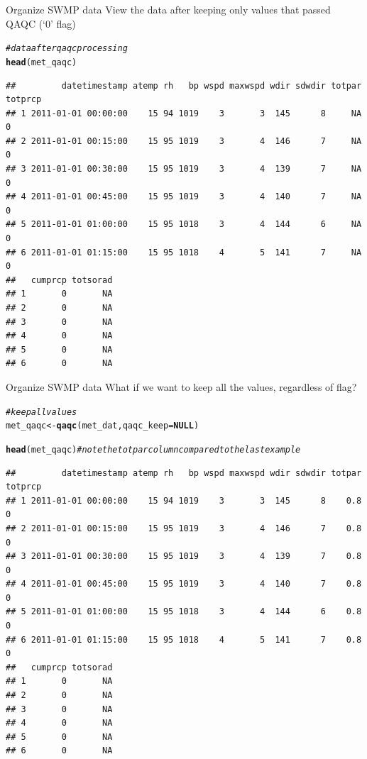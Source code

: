 \documentclass[xcolor=svgnames]{beamer}\usepackage[]{graphicx}\usepackage[]{color}
\makeatletter
\newcommand{\hlcom}[1]{\textcolor[rgb]{0.678,0.584,0.686}{\textit{#1}}}%
\newcommand{\hlstd}[1]{\textcolor[rgb]{0.345,0.345,0.345}{#1}}%
\newcommand{\hlkwa}[1]{\textcolor[rgb]{0.161,0.373,0.58}{\textbf{#1}}}%
\newcommand{\hlkwb}[1]{\textcolor[rgb]{0.69,0.353,0.396}{#1}}%
\newcommand{\hlkwc}[1]{\textcolor[rgb]{0.333,0.667,0.333}{#1}}%
\newcommand{\hlkwd}[1]{\textcolor[rgb]{0.737,0.353,0.396}{\textbf{#1}}}%
\newenvironment{kframe}{%
 \def\at@end@of@kframe{}%
 \ifinner\ifhmode%
  \def\at@end@of@kframe{\end{minipage}}%
  \begin{minipage}{\columnwidth}%
 \fi\fi%
 \def\FrameCommand##1{\hskip\@totalleftmargin \hskip-\fboxsep
 \colorbox{shadecolor}{##1}\hskip-\fboxsep
     \hskip-\linewidth \hskip-\@totalleftmargin \hskip\columnwidth}%
 \MakeFramed {\advance\hsize-\width
   \@totalleftmargin\z@ \linewidth\hsize
   \@setminipage}}%
 {\par\unskip\endMakeFramed%
 \at@end@of@kframe}
\newenvironment{knitrout}{}{} %
\makeatother
\begin{document}
\begin{frame}[containsverbatim]{Organize SWMP data}
View the data after keeping only values that passed QAQC (`0' flag)
\begin{knitrout}\scriptsize
{}\color{fgcolor}\begin{kframe}
\begin{alltt}
\hlcom{# data after qaqc processing}
\hlkwd{head}\hlstd{(met_qaqc)}
\end{alltt}
\begin{verbatim}
##         datetimestamp atemp rh   bp wspd maxwspd wdir sdwdir totpar totprcp
## 1 2011-01-01 00:00:00    15 94 1019    3       3  145      8     NA       0
## 2 2011-01-01 00:15:00    15 95 1019    3       4  146      7     NA       0
## 3 2011-01-01 00:30:00    15 95 1019    3       4  139      7     NA       0
## 4 2011-01-01 00:45:00    15 95 1019    3       4  140      7     NA       0
## 5 2011-01-01 01:00:00    15 95 1018    3       4  144      6     NA       0
## 6 2011-01-01 01:15:00    15 95 1018    4       5  141      7     NA       0
##   cumprcp totsorad
## 1       0       NA
## 2       0       NA
## 3       0       NA
## 4       0       NA
## 5       0       NA
## 6       0       NA
\end{verbatim}
\end{kframe}
\end{knitrout}
\end{frame}

\begin{frame}[containsverbatim]{Organize SWMP data}
What if we want to keep all the values, regardless of flag?
\begin{knitrout}\scriptsize
{}\color{fgcolor}\begin{kframe}
\begin{alltt}
\hlcom{# keep all values}
\hlstd{met_qaqc} \hlkwb{<-} \hlkwd{qaqc}\hlstd{(met_dat,} \hlkwc{qaqc_keep} \hlstd{=} \hlkwa{NULL}\hlstd{)}

\hlkwd{head}\hlstd{(met_qaqc)} \hlcom{# note the totpar column compared to the last example}
\end{alltt}
\begin{verbatim}
##         datetimestamp atemp rh   bp wspd maxwspd wdir sdwdir totpar totprcp
## 1 2011-01-01 00:00:00    15 94 1019    3       3  145      8    0.8       0
## 2 2011-01-01 00:15:00    15 95 1019    3       4  146      7    0.8       0
## 3 2011-01-01 00:30:00    15 95 1019    3       4  139      7    0.8       0
## 4 2011-01-01 00:45:00    15 95 1019    3       4  140      7    0.8       0
## 5 2011-01-01 01:00:00    15 95 1018    3       4  144      6    0.8       0
## 6 2011-01-01 01:15:00    15 95 1018    4       5  141      7    0.8       0
##   cumprcp totsorad
## 1       0       NA
## 2       0       NA
## 3       0       NA
## 4       0       NA
## 5       0       NA
## 6       0       NA
\end{verbatim}
\end{kframe}
\end{knitrout}
\end{frame}
\end{document}
